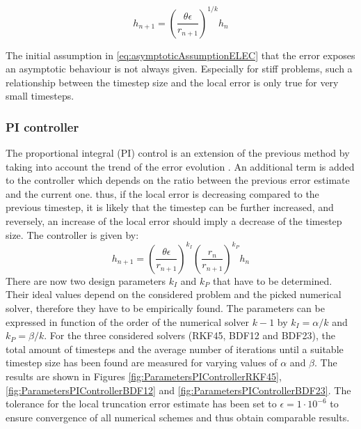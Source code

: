 \begin{equation}
    \label{eq:ELEController}
    h_{n+1} = \left(\frac{\theta\epsilon}{r_{n+1}}\right)^{1/k}h_n
\end{equation}

The initial assumption in \autoref{eq:asymptoticAssumptionELEC} that the error exposes an asymptotic behaviour is not always given. Especially for stiff problems, such a relationship between the timestep size and the local error is only true for very small timesteps. 
\subsubsection{PI controller}
The proportional integral (PI) control is an extension of the previous method by taking into account the trend of the error evolution \cite{AutomControlAdaptTS}. An additional term is added to the controller which depends on the ratio between the previous error estimate and the current one. thus, if the local error is decreasing compared to the previous timestep, it is likely that the timestep can be further increased, and reversely, an increase of the local error should imply a decrease of the timestep size. The controller is given by:
\begin{equation}
h_{n+1} = \left(\frac{\theta\epsilon}{r_{n+1}}\right)^{k_I} \left(\frac{r_n}{r_{n+1}}\right)^{k_P} h_n 
\end{equation}
There are now two design parameters $k_I$ and $k_P$ that have to be determined. Their ideal values depend on the considered problem and the picked numerical solver, therefore they have to be empirically found. The parameters can be expressed in function of the order of the numerical solver $k-1$ by $k_I = \alpha / k$ and $k_P = \beta / k$. For the three considered solvers (RKF45, BDF12 and BDF23), the total amount of timesteps and the average number of iterations until a suitable timestep size has been found are measured for varying values of $\alpha$ and $\beta$. The results are shown in Figures \ref{fig:ParametersPIControllerRKF45},  \ref{fig:ParametersPIControllerBDF12} and  \ref{fig:ParametersPIControllerBDF23}. The tolerance for the local truncation error estimate has been set to $\epsilon=1\cdot 10^{-6}$ to ensure convergence of all numerical schemes and thus obtain comparable results. 
